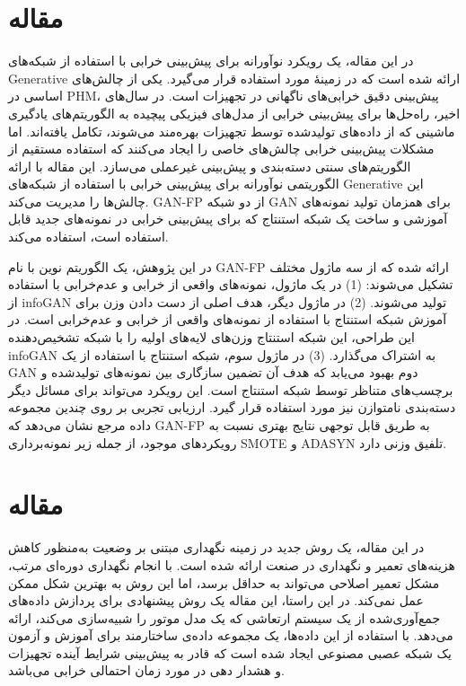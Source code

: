 \documentclass[a4paper,10pt]{article}
\begin{document}
	
	\section{مقاله \textcolor{blue}{\cite{article40}}}
در این مقاله، یک رویکرد نوآورانه برای پیش‌بینی خرابی با استفاده از شبکه‌های Generative ارائه شده است که در زمینهٔ  مورد استفاده قرار می‌گیرد. یکی از چالش‌های اساسی در PHM، پیش‌بینی دقیق خرابی‌های ناگهانی در تجهیزات است. در سال‌های اخیر، راه‌حل‌ها برای پیش‌بینی خرابی از مدل‌های فیزیکی پیچیده به الگوریتم‌های یادگیری ماشینی که از داده‌های تولیدشده توسط تجهیزات بهره‌مند می‌شوند، تکامل یافته‌اند. اما مشکلات پیش‌بینی خرابی چالش‌های خاصی را ایجاد می‌کنند که استفاده مستقیم از الگوریتم‌های سنتی دسته‌بندی و پیش‌بینی غیرعملی می‌سازد. این مقاله با ارائه الگوریتمی نوآورانه برای پیش‌بینی خرابی با استفاده از شبکه‌های Generative این چالش‌ها را مدیریت می‌کند. GAN-FP از دو شبکه GAN برای همزمان تولید نمونه‌های آموزشی و ساخت یک شبکه استنتاج که برای پیش‌بینی خرابی در نمونه‌های جدید قابل استفاده است، استفاده می‌کند.

در این پژوهش، یک الگوریتم نوین با نام GAN-FP ارائه شده که از سه ماژول مختلف تشکیل می‌شوند: (1) در یک ماژول، نمونه‌های واقعی از خرابی و عدم‌خرابی با استفاده از infoGAN تولید می‌شوند. (2) در ماژول دیگر، هدف اصلی از دست دادن وزن برای آموزش شبکه استنتاج با استفاده از نمونه‌های واقعی از خرابی و عدم‌خرابی است. در این طراحی، این شبکه استنتاج وزن‌های لایه‌های اولیه را با شبکه تشخیص‌دهنده infoGAN به اشتراک می‌گذارد. (3) در ماژول سوم، شبکه استنتاج با استفاده از یک GAN دوم بهبود می‌یابد که هدف آن تضمین سازگاری بین نمونه‌های تولیدشده و برچسب‌های متناظر توسط شبکه استنتاج است. این رویکرد می‌تواند برای مسائل دیگر دسته‌بندی نامتوازن نیز مورد استفاده قرار گیرد. ارزیابی تجربی بر روی چندین مجموعه داده مرجع نشان می‌دهد که GAN-FP به طریق قابل توجهی نتایج بهتری نسبت به رویکردهای موجود، از جمله زیر نمونه‌برداری SMOTE و ADASYN تلفیق وزنی دارد.

	
	\section{مقاله \textcolor{blue}{\cite{article5}}}
در این مقاله، یک روش جدید در زمینه نگهداری مبتنی بر وضعیت  به‌منظور کاهش هزینه‌های تعمیر و نگهداری در صنعت ارائه شده است. با انجام نگهداری دوره‌ای مرتب، مشکل تعمیر اصلاحی می‌تواند به حداقل برسد، اما این روش به بهترین شکل ممکن عمل نمی‌کند. در این راستا، این مقاله یک روش پیشنهادی برای پردازش داده‌های جمع‌آوری‌شده از یک سیستم ارتعاشی که یک مدل موتور را شبیه‌سازی می‌کند، ارائه می‌دهد. با استفاده از این داده‌ها، یک مجموعه داده‌ی ساختارمند برای آموزش و آزمون یک شبکه عصبی مصنوعی ایجاد شده است که قادر به پیش‌بینی شرایط آینده تجهیزات و هشدار دهی در مورد زمان احتمالی خرابی می‌باشد.
\end{document}
